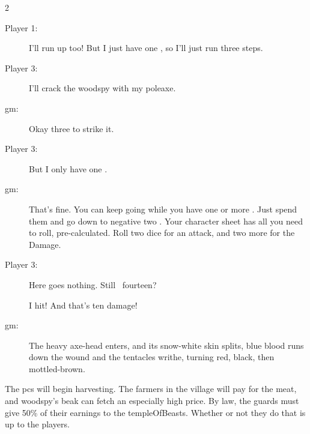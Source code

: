 \begin{multicols}{2}
\begin{description}
  \item[Player 1:] I'll run up too!
  But I just have one , so I'll just run three \glspl{step}.

  \item[Player 3:] I'll crack the \gls{woodspy} with my poleaxe.

  \item[\Gls{gm}:] Okay three  to strike it.

  \item[Player 3:] But I only have one .

  \item[\Gls{gm}:] That's fine.
  You can keep going while you have one or more .
  Just spend them and go down to negative two .
  Your character sheet has all you need to roll, pre-calculated.
  Roll two dice for an attack, and two more for the Damage.

  \item[Player 3:] Here goes nothing.
  Still ~fourteen?

  \qquad{}

  I hit!
  And that's ten damage!

  \item[\Gls{gm}:] The heavy axe-head enters, and its snow-white skin splits, blue
  blood runs down the wound and the tentacles writhe, turning red, black, then
  mottled-brown.
\end{description}

\bigLine

The \glspl{pc} will begin \gls{harvesting}.
The farmers in the \gls{village} will pay for the meat, and \gls{woodspy}'s beak can fetch an especially high price.
By law, the \glspl{guard} must give 50\% of their earnings to the \gls{templeOfBeasts}.
Whether or not they do that is up to the players.

\end{multicols}
